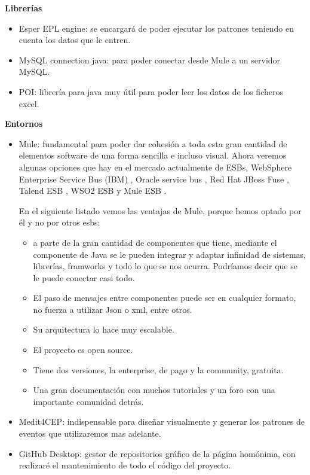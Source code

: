 \documentclass[a4paper]{article}
\begin{document}
\textbf{Librerías}
\begin{itemize}
\item Esper EPL engine: se encargará de poder ejecutar los patrones teniendo en cuenta los datos que le entren.
\item MySQL connection java: para poder conectar desde Mule a un servidor MySQL.
\item POI: librería para java muy útil para poder leer los datos de los ficheros excel.
\end{itemize}

\textbf{Entornos}
\begin{itemize}
\item Mule: fundamental para poder dar cohesión a toda esta gran cantidad de elementos software de una forma sencilla e incluso visual. Ahora veremos algunas opciones que hay en el mercado actualmente de ESBs, WebSphere Enterprise Service Bus (IBM) \cite{webWebSphere}, Oracle service bus \cite{webOracleBus}, Red Hat JBoss Fuse \cite{webJBoss}, Talend ESB \cite{webTalend}, WSO2 ESB \cite{webWso2} y Mule ESB \cite{webMule}.

      En el siguiente listado vemos las ventajas de Mule, porque hemos optado por él y no por otros esbs:
      \begin{itemize}
      \item a parte de la gran cantidad de componentes que tiene, mediante el componente de Java se le pueden integrar y adaptar infinidad de sistemas, librerías, framworks y todo lo que se nos ocurra. Podríamos decir que se le puede conectar casi todo.
      \item El paso de mensajes entre componentes puede ser en cualquier formato, no fuerza a utilizar Json o xml, entre otros.
      \item Su arquitectura lo hace muy escalable.
      \item El proyecto es open source.
      \item Tiene dos versiones, la enterprise, de pago y la community, gratuita.
      \item Una gran documentación con muchos tutoriales y un foro con una importante comunidad detrás.
      \end{itemize}
\item Medit4CEP\cite{articuloBoubeta}: indispensable para diseñar visualmente y generar los patrones de eventos que utilizaremos mas adelante.
\item GitHub Desktop: gestor de repositorios gráfico de la página homónima, con realizaré el mantenimiento de todo el código del proyecto.
\end{itemize}
\end{document}

